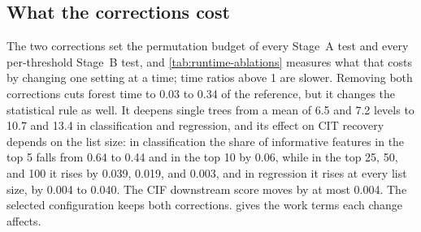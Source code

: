 \subsection{What the corrections cost}
\label{sec:results-practical}

The two corrections set the permutation budget of every Stage~A test and every
per-threshold Stage~B test, and \cref{tab:runtime-ablations} measures what that
costs by changing one setting at a time; time ratios above 1 are slower.
Removing both corrections cuts
forest time to 0.03 to 0.34 of the reference, but it changes the statistical
rule as well. It deepens single trees from a mean of 6.5 and 7.2 levels to 10.7
and 13.4 in classification and regression, and its effect on CIT recovery
depends on the list size: in classification the share of informative features
in the top 5 falls from 0.64 to 0.44 and in the top 10 by 0.06, while in the top
25, 50, and 100 it rises by 0.039, 0.019, and 0.003, and in regression it rises
at every list size, by 0.004 to 0.040. The CIF downstream score moves by at
most 0.004. The selected configuration keeps both corrections.
 gives the work terms each change affects.

